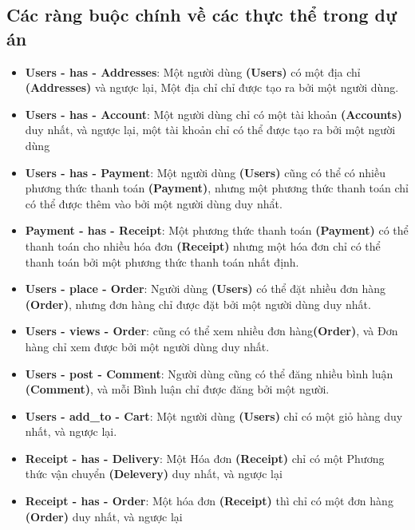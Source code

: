 \subsection{Các ràng buộc chính về các thực thể trong dự án}
\begin{itemize}
    \item \textbf{Users - has - Addresses}:  Một người dùng \textbf{(Users)} có một địa chỉ \textbf{(Addresses)} và ngược lại, Một địa chỉ chỉ được tạo ra bởi một người dùng.
    
    \item \textbf{Users - has - Account}: Một người dùng chỉ có một tài khoản \textbf{(Accounts)} duy nhất, và ngược lại, một tài khoản chỉ có thể được tạo ra bởi một người dùng 
    
    \item \textbf{Users - has - Payment}: Một người dùng \textbf{(Users)} cũng có thể có nhiều phương thức thanh toán \textbf{(Payment)}, nhưng một phương thức thanh toán chỉ có thể được thêm vào bởi một người dùng duy nhẩt.
    
    \item \textbf{Payment - has - Receipt}: Một phương thức thanh toán \textbf{(Payment)} có thể thanh toán cho nhiều hóa đơn \textbf{(Receipt)} nhưng một hóa đơn chỉ có thể thanh toán bởi một phương thức thanh toán nhất định.
    
    \item \textbf{Users - place - Order}: Người dùng \textbf{(Users)} có thể đặt nhiều đơn hàng \textbf{(Order)}, nhưng đơn hàng chỉ được đặt bởi một người dùng duy nhất.
    
    \item \textbf{Users - views - Order}: cũng có thể xem nhiều đơn hàng\textbf{(Order)}, và Đơn hàng chỉ xem được bởi một người dùng duy nhất.
    
    \item \textbf{Users - post - Comment}: Người dùng cũng có thể đăng nhiều bình luận \textbf{(Comment)}, và mỗi Bình luận chỉ được đăng bởi một người.

    \item \textbf{Users - add\_to - Cart}:  Một người dùng \textbf{(Users)} chỉ có một giỏ hàng duy nhất, và ngược lại.
    
    \item \textbf{Receipt - has - Delivery}: Một Hóa đơn \textbf{(Receipt)} chỉ có một Phương thức vận chuyển \textbf{(Delevery)} duy nhất, và ngược lại

    \item \textbf{Receipt - has - Order}: Một hóa đơn \textbf{(Receipt)} thì chỉ có một đơn hàng \textbf{(Order)} duy nhất, và ngược lại


\end{itemize}
